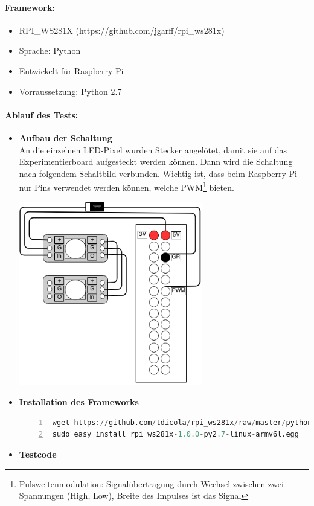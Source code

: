\paragraph{Framework:}
	\begin{itemize}
	\item RPI\_WS281X (https://github.com/jgarff/rpi\_ws281x)
	\item Sprache: Python
	\item Entwickelt für Raspberry Pi
	\item Vorraussetzung: Python 2.7
	\end{itemize}
\paragraph{Ablauf des Tests:}
\begin{itemize}

\item \textbf{Aufbau der Schaltung}\\
An die einzelnen LED-Pixel wurden Stecker angelötet, damit sie auf das Experimentierboard aufgesteckt werden können. Dann wird die Schaltung nach folgendem Schaltbild verbunden. Wichtig ist, dass beim Raspberry Pi nur Pins verwendet werden können, welche PWM\footnote{Pulsweitenmodulation: Signalübertragung durch Wechsel zwischen zwei Spannungen (High, Low), Breite des Impulses ist das Signal} bieten. \\
\begin{minipage}{\linewidth}
            \centering
            \includegraphics[width=8cm]{./data/TestSchaltungLED.png}
        \end{minipage}
\item \textbf{Installation des Frameworks} 
\begin{lstlisting}[caption = Installation Framework ws281x, language=Python, frame=single, breaklines=true,columns=fullflexible, commentstyle=\color{gray}\upshape, captionpos=b, numbers = left]
wget https://github.com/tdicola/rpi_ws281x/raw/master/python/dist/rpi_ws281x-1.0.0-py2.7-linux-armv6l.egg 
sudo easy_install rpi_ws281x-1.0.0-py2.7-linux-armv6l.egg
\end{lstlisting}
\item \textbf{Testcode}


\end{itemize}
